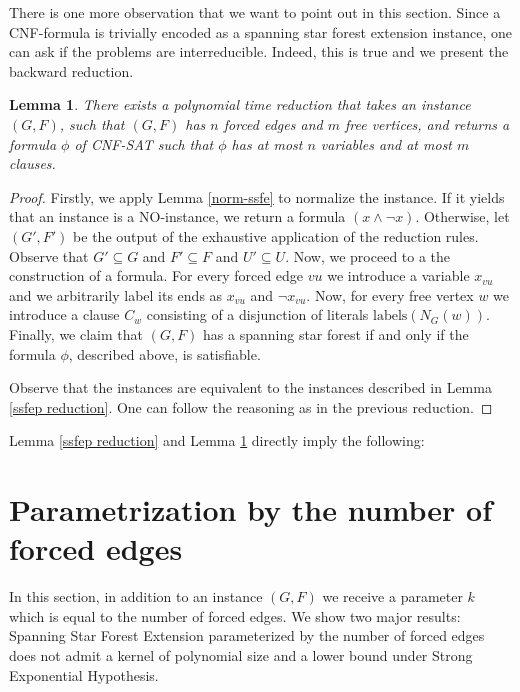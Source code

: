 \documentclass[en]{pracamgr}
\newtheorem{lemma}{Lemma}
\theoremstyle{definition}
\newcommand{\ssfep}{{\sc Spanning Star Forest Extension}}
\newcommand{\cnfsat}{{\sc CNF-SAT}}
\begin{document}
There is one more observation that we want to point out in this section. Since a CNF-formula is trivially encoded as a spanning star forest extension instance, one can ask if the problems are interreducible. Indeed, this is true and we present the backward reduction.

\begin{lemma}\label{cnfsat reduction}
	There exists a polynomial time reduction that takes an instance $(G,F)$, such that $(G,F)$ has $n$ forced edges and $m$ free vertices, and returns a formula $\phi$ of \cnfsat{} such that $\phi$ has at most $n$ variables and at most $m$ clauses.
\end{lemma}

\begin{proof}
	Firstly, we apply Lemma \ref{norm-ssfe} to normalize the instance. If it yields that an instance is a NO-instance, we return a formula $(x \land \neg x)$. Otherwise, let $(G',F')$ be the output of the exhaustive application of the reduction rules. Observe that $G' \subseteq G$ and $F' \subseteq F$ and $U' \subseteq U$. Now, we proceed to a the construction of a formula. For every forced edge $vu$ we introduce a variable $x_{vu}$ and we arbitrarily label its ends as $x_{vu}$ and $\neg x_{vu}$. Now, for every free vertex $w$ we introduce a clause $C_w$ consisting of a disjunction of literals $\textrm{labels}(N_G(w))$. Finally, we claim that $(G,F)$ has a spanning star forest if and only if the formula $\phi$, described above, is satisfiable.
	
	Observe that the instances are equivalent to the instances described in Lemma \ref{ssfep reduction}. One can follow the reasoning as in the previous reduction.
\end{proof}

Lemma \ref{ssfep reduction} and Lemma \ref{cnfsat reduction} directly imply the following:

\thmssfepnpc*

\section{Parametrization by the number of forced edges}

In this section, in addition to an instance $(G,F)$ we receive a parameter $k$ which is equal to the number of forced edges. We show two major results: \ssfep{} parameterized by the number of forced edges does not admit a kernel of polynomial size and a lower bound under Strong Exponential Hypothesis.
\end{document}
